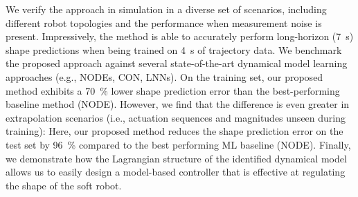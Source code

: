 We verify the approach in simulation in a diverse set of scenarios, including different robot topologies and the performance when measurement noise is present. Impressively, the method is able to accurately perform long-horizon (\SI{7}{s}) shape predictions when being trained on \SI{4}{s} of trajectory data.
We benchmark the proposed approach against several state-of-the-art dynamical model learning approaches (e.g., \glspl{NODE}, \gls{CON}, \glspl{LNN}). On the training set, our proposed method exhibits a \SI{70}{\percent} lower shape prediction error than the best-performing baseline method (\gls{NODE}).
However, we find that the difference is even greater in extrapolation scenarios (i.e., actuation sequences and magnitudes unseen during training): Here, our proposed method reduces the shape prediction error on the test set by \SI{96}{\percent} compared to the best performing \gls{ML} baseline (\gls{NODE}).
Finally, we demonstrate how the Lagrangian structure of the identified dynamical model allows us to easily design a model-based controller that is effective at regulating the shape of the soft robot.


